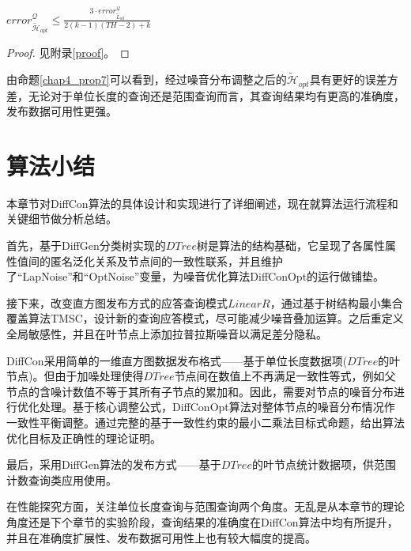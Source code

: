 \begin{prop}
	\label{chap4_prop7}
	$error_{\tilde{\mathcal{H}}_{opt}}^{\mathcal{Q}} \leqslant \frac{3 \cdotp error_{\tilde{L}_{all}}^{\mathcal{Q}}}{2(k-1)(TH-2)+k}$
\end{prop}
\begin{proof}
	见附录\ref{proof}。
\end{proof}

由命题\ref{chap4_prop7}可以看到，经过噪音分布调整之后的$\tilde{\mathcal{H}}_{opt}$具有更好的误差方差，无论对于单位长度的查询还是范围查询而言，其查询结果均有更高的准确度，发布数据可用性更强。

\section{算法小结}

本章节对DiffCon算法的具体设计和实现进行了详细阐述，现在就算法运行流程和关键细节做分析总结。

首先，基于DiffGen分类树实现的$DTree$树是算法的结构基础，它呈现了各属性属性值间的匿名泛化关系及节点间的一致性联系，并且维护了“LapNoise”和“OptNoise”变量，为噪音优化算法DiffConOpt的运行做铺垫。

接下来，改变直方图发布方式的应答查询模式$LinearR$，通过基于树结构最小集合覆盖算法TMSC，设计新的查询应答模式，尽可能减少噪音叠加运算。之后重定义全局敏感性，并且在叶节点上添加拉普拉斯噪音以满足差分隐私。

DiffCon采用简单的一维直方图数据发布格式——基于单位长度数据项($DTree$的叶节点)。但由于加噪处理使得$DTree$节点间在数值上不再满足一致性等式，例如父节点的含噪计数值不等于其所有子节点的累加和。因此，需要对节点的噪音分布进行优化处理。基于核心调整公式，DiffConOpt算法对整体节点的噪音分布情况作一致性平衡调整。通过完整的基于一致性约束的最小二乘法目标式命题，给出算法优化目标及正确性的理论证明。

最后，采用DiffGen算法的发布方式——基于$DTree$的叶节点统计数据项，供范围计数查询类应用使用。

在性能探究方面，关注单位长度查询与范围查询两个角度。无乱是从本章节的理论角度还是下个章节的实验阶段，查询结果的准确度在DiffCon算法中均有所提升，并且在准确度扩展性、发布数据可用性上也有较大幅度的提高。


